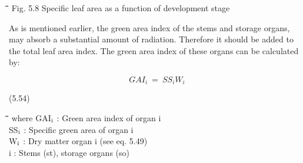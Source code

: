 \documentclass[11pt]{article}
\begin{document}
\bigskip
\bigskip
\bigskip
\bigskip
\bigskip
\bigskip
\bigskip
\bigskip
\bigskip
\bigskip
\bigskip
\bigskip
\bigskip
\bigskip
\bigskip
\bigskip
\bigskip
\nwln
\begin{tabbing}
\hspace{1.27cm}\=\hspace{1.27cm}\=\hspace{1.27cm}\=\hspace{1.27cm}\=%
\hspace{1.27cm}\=\hspace{1.27cm}\=\hspace{1.27cm}\=\hspace{1.27cm}\=%
\hspace{1.27cm}\=\hspace{1.27cm}\=\kill
Fig. 5.8 \> \> Spe\-cific leaf area as a function of develop\-ment stage
\end{tabbing}

\bigskip
\bigskip
As is men\-tioned earlier, the green area index of the stems and storage or\-gans, may absorb
a substan\-tial amount of radiation. Therefore it should be added to the total leaf area
index. The green area index of these organs can be calculated by:

\begin{displaymath}
GAI  _{i} ~=~SS _{i} W _{i} 
\end{displaymath}

 \bigskip
\strut\hfill (5.54)
\nwln
\begin{tabbing}
\hspace{1.27cm}\=\hspace{1.27cm}\=\hspace{1.27cm}\=\hspace{1.27cm}\=%
\hspace{1.27cm}\=\hspace{1.27cm}\=\hspace{1.27cm}\=\hspace{1.27cm}\=%
\hspace{1.27cm}\=\hspace{1.27cm}\=\kill
where\> GAI$_{{\rm i}}$\> : Green area index of organ i \> \> \> \> \> \> \> \> [ha ha$^{{\rm -1}}$]\\
\>SS$_{{\rm i}}$\> : Specific green area of organ i\> \> \> \> \> \> \> \> [ha kg$^{{\rm -1}}$]\\
\>W$_{{\rm i}}$\> : Dry matter organ i (see eq. 5.49)\> \> \> \> \> \> \> \> [kg ha$_{{\rm -1}}$]\\
\>i\> : Stems (st), storage organs (so)
\end{tabbing}
\end{document}
